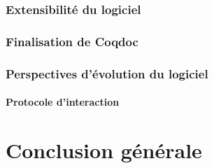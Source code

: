 \documentclass[a4paper, 11pt]{report}
\begin{document}
    \subsection{Extensibilité du logiciel}
    \subsection{Finalisation de Coqdoc}
    \subsection{Perspectives d'évolution du logiciel}
    \subsubsection{Protocole d'interaction}
\chapter{Conclusion générale}

\end{document}
